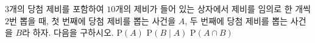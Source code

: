 $3$개의 당첨 제비를 포함하여 $10$개의 제비가 들어 있는 상자에서 제비를 임의로 한 개씩 $2$번 뽑을 때, 첫 번째에 당첨 제비를 뽑는 사건을 $A$, 두 번째에 당첨 제비를 뽑는 사건을 $B$라 하자. 다음을 구하시오. 
 $\mathrm{P}(A)$
 $\mathrm{P}(B\mid A)$
 $\mathrm{P}(A\cap B)$
